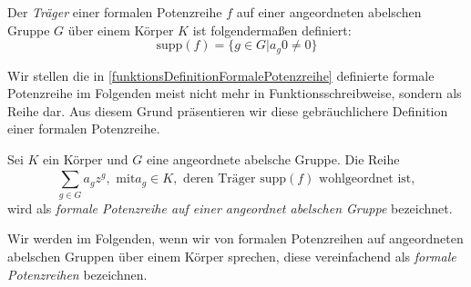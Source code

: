 \begin{defn}\label{TraegerFormalePotenzreihe}
Der \textit{Träger} einer formalen Potenzreihe $f$ auf einer angeordneten abelschen Gruppe $G$ über einem Körper $K$ ist folgendermaßen definiert: 
\[ \text{supp}(f) = \lbrace g \in G \vert a_g 0\neq 0\rbrace\]
\end{defn}
%
%
%
Wir stellen die in \ref{funktionsDefinitionFormalePotenzreihe} definierte formale Potenzreihe im Folgenden meist nicht mehr in Funktionsschreibweise, sondern als Reihe dar. Aus diesem Grund präsentieren wir diese gebräuchlichere Definition einer formalen Potenzreihe.
\begin{defn}
Sei $K$ ein Körper und $G$ eine angeordnete abelsche Gruppe. Die Reihe 
\[\sum_{g \in G}^{}a_g z^g, \text{ mit} a_g \in K, \text{ deren Träger supp}(f) \text{ wohlgeordnet ist}, \]
wird als \textit{formale Potenzreihe auf einer angeordnet abelschen Gruppe} bezeichnet.
\end{defn}
%
%
% 
%
%
%
\begin{nota}
Wir werden im Folgenden, wenn wir von formalen Potenzreihen auf angeordneten abelschen Gruppen über einem Körper sprechen, diese vereinfachend als \textit{formale Potenzreihen} bezeichnen.
\end{nota}
%
%
%
%
%
%
%
